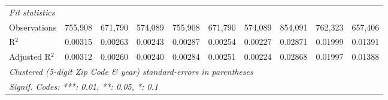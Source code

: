 \begin{tabular}{lccccccccc}
   \midrule
   \emph{Fit statistics}\\
   Observations                                               & 755,908        & 671,790        & 574,089        & 755,908        & 671,790        & 574,089        & 854,091        & 762,323        & 657,406\\  
   R$^2$                                                      & 0.00315        & 0.00263        & 0.00243        & 0.00287        & 0.00254        & 0.00227        & 0.02871        & 0.01999        & 0.01391\\  
   Adjusted R$^2$                                             & 0.00312        & 0.00260        & 0.00240        & 0.00284        & 0.00251        & 0.00224        & 0.02868        & 0.01997        & 0.01388\\  
   \midrule \midrule
   \multicolumn{10}{l}{\emph{Clustered (5-digit Zip Code \& year) standard-errors in parentheses}}\\
   \multicolumn{10}{l}{\emph{Signif. Codes: ***: 0.01, **: 0.05, *: 0.1}}\\
\end{tabular}
\par\endgroup

